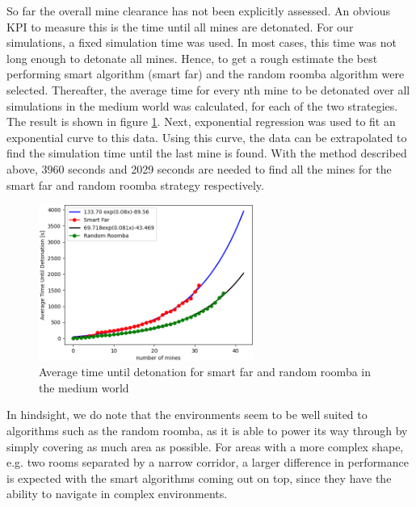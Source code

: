 \documentclass[conference]{IEEEtran}
\begin{document}
So far the overall mine clearance has not been explicitly assessed. An obvious KPI to measure this is the time until all mines are detonated. For our simulations, a fixed simulation time was used. In most cases, this time was not long enough to detonate all mines. Hence, to get a rough estimate the best performing smart algorithm (smart far) and the random roomba algorithm were selected. Thereafter, the average time for every nth mine to be detonated over all simulations in the medium world was calculated, for each of the two strategies. The result is shown in figure \ref{fig:ATUD}. Next, exponential regression was used to fit an exponential curve to this data. Using this curve, the data can be extrapolated to find the simulation time until the last mine is found. With the method described above, 3960 seconds and 2029 seconds are needed to find all the mines for the smart far and random roomba strategy respectively.\\

\begin{figure}[htbp]
    \centering
    \includegraphics[width=70mm]{Analysis_Medium_AverageTimeUntilDetonation.png}
    \caption{Average time until detonation for smart far and random roomba in the medium world}
    \label{fig:ATUD}
\end{figure}

In hindsight, we do note that the environments seem to be well suited to algorithms such as the random roomba, as it is able to power its way through by simply covering as much area as possible. For areas with a more complex shape, e.g. two rooms separated by a narrow corridor, a larger difference in performance is expected with the smart algorithms coming out on top, since they have the ability to navigate in complex environments.\\
\end{document}

